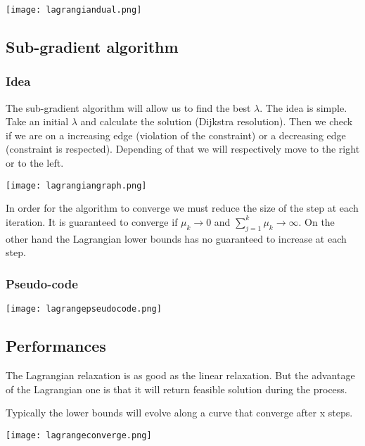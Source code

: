 \centerline{\texttt{[image: lagrangiandual.png]}}

\subsection{Sub-gradient algorithm}

\subsubsection{Idea}

The sub-gradient algorithm will allow us to find the best $\lambda$. The
idea is simple. Take an initial $\lambda$ and calculate the solution
(Dijkstra resolution). Then we check if we are on a increasing edge
(violation of the constraint) or a decreasing edge (constraint is
respected). Depending of that we will respectively move to the right or
to the left.

\centerline{\texttt{[image: lagrangiangraph.png]}}

In order for the algorithm to converge we must reduce the size of the
step at each iteration. It is guaranteed to converge if $\mu_{k}
\rightarrow 0$ and $\sum^{k}_{j=1} \mu_{k} \rightarrow \infty$.
On the other hand the Lagrangian lower bounds has no guaranteed to increase at each step.

\subsubsection{Pseudo-code}

\centerline{\texttt{[image: lagrangepseudocode.png]}}

\subsection{Performances}

The Lagrangian relaxation is as good as the linear relaxation. But the
advantage of the Lagrangian one is that it will return feasible solution
during the process.

Typically the lower bounds will evolve along a curve that converge after x steps.

\centerline{\texttt{[image: lagrangeconverge.png]}}
